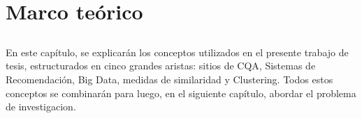 \chapter*{Marco teórico}\label{ch:marcoteorico}

\section*{}
\addtocounter{section}{1}
\setcounter{subsection}{0}

En este capítulo, se explicarán los conceptos utilizados en el presente trabajo de tesis, estructurados en cinco grandes aristas: sitios de CQA, Sistemas de Recomendación, Big Data, medidas de similaridad y Clustering. Todos estos conceptos se combinarán para luego, en el siguiente capítulo, abordar el problema de investigacion.









